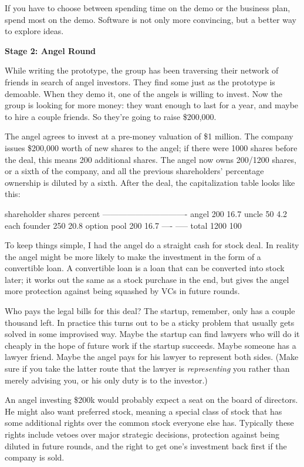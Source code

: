 If you have to choose between spending time on the demo or the
business plan, spend most on the demo.   Software is not only more
convincing, but a better way to explore ideas.

\textbf{Stage 2: Angel Round}

While writing the prototype, the group has been traversing their
network of friends in search of angel investors.  They find some
just as the prototype is demoable.  When they demo it, one of the
angels is willing to invest.  Now the group is looking for more
money: they want enough to last for a year, and maybe to hire a
couple friends.  So they're going to raise \$200,000.

The angel agrees to invest at a pre-money valuation of \$1 million.
The company issues \$200,000 worth of new shares to the angel; if
there were 1000 shares before the deal, this means 200 additional
shares.  The angel now owns 200/1200 shares, or a sixth of the
company, and all the previous shareholders' percentage ownership
is diluted by a sixth.  After the deal, the capitalization table
looks like this:

shareholder   shares    percent
-------------------------------
angel           200       16.7
uncle            50        4.2
each founder    250       20.8
option pool     200       16.7
               ----      -----
total          1200      100

To keep things simple, I had the angel do a straight cash for stock
deal.  In reality the angel might be more likely to make the
investment in the form of a convertible loan.  A convertible loan
is a loan that can be converted into stock later; it works out the
same as a stock purchase in the end, but gives the angel more
protection against being squashed by VCs in future rounds.

Who pays the legal bills for this deal?  The startup, remember,
only has a couple thousand left.  In practice this turns out to be
a sticky problem that usually gets solved in some improvised way.
Maybe the startup can find lawyers who will do it cheaply in the
hope of future work if the startup succeeds.  Maybe someone has a
lawyer friend.  Maybe the angel pays for his lawyer to represent
both sides.  (Make sure if you take the latter route that the lawyer
is \emph{representing} you rather than merely advising you, or his
only duty is to the investor.)

An angel investing \$200k would probably expect a seat on the board
of directors.  He might also want preferred stock, meaning a special
class of stock that has some additional rights over the common stock
everyone else has.  Typically these rights include vetoes over major
strategic decisions, protection against being diluted in future
rounds, and the right to get one's investment back first if the
company is sold.

